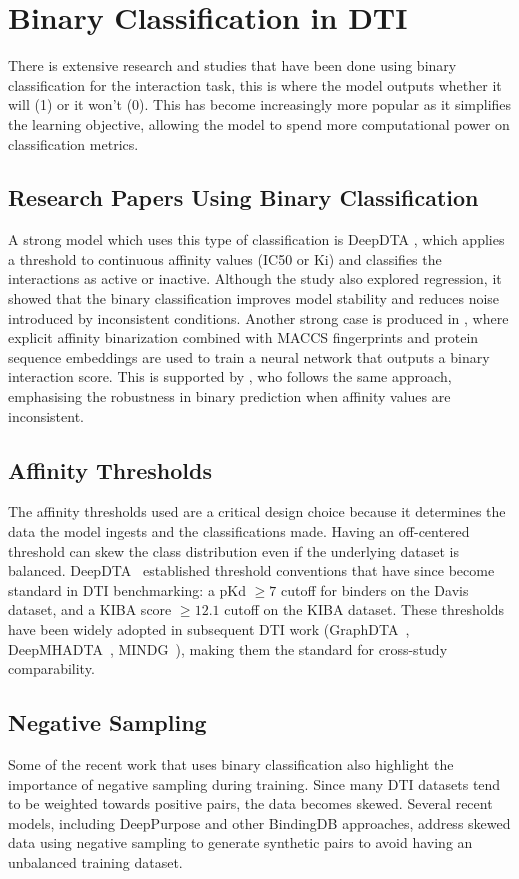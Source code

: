 \section{Binary Classification in DTI}
There is extensive research and studies that have been done using binary classification for the interaction task, this is where the model outputs whether it will (1) or it won't (0).
This has become increasingly more popular as it simplifies the learning objective, allowing the model to spend more computational power on classification metrics.

\subsection{Research Papers Using Binary Classification}
A strong model which uses this type of classification is DeepDTA \citep{Ozturk2018}, which applies a threshold to continuous affinity values (IC50 or Ki) and classifies the interactions as active or inactive.
Although the study also explored regression, it showed that the binary classification improves model stability and reduces noise introduced by inconsistent conditions.
Another strong case is produced in \citet{Talukder2025}, where explicit affinity binarization combined with MACCS fingerprints and protein sequence embeddings are used to train a neural network that outputs a binary interaction score.
This is supported by \citet{Zhan2025}, who follows the same approach, emphasising the robustness in binary prediction when affinity values are inconsistent.

\subsection{Affinity Thresholds}
The affinity thresholds used are a critical design choice because it determines the data the model ingests and the classifications made.
Having an off-centered threshold can skew the class distribution even if the underlying dataset is balanced.
DeepDTA~\citep{Ozturk2018} established threshold conventions that have since become standard in DTI benchmarking: a pKd $\geq 7$ cutoff for binders on the Davis dataset, and a KIBA score $\geq 12.1$ cutoff on the KIBA dataset.
These thresholds have been widely adopted in subsequent DTI work (GraphDTA~\citep{Nguyen2021}, DeepMHADTA~\citep{Deng2022}, MINDG~\citep{Yang2024}), making them the standard for cross-study comparability.
\subsection{Negative Sampling}
Some of the recent work that uses binary classification also highlight the importance of negative sampling during training.
Since many DTI datasets tend to be weighted towards positive pairs, the data becomes skewed.
Several recent models, including DeepPurpose \citep{DeepLearning} and other BindingDB approaches, address skewed data using negative sampling to generate synthetic pairs to avoid having an unbalanced training dataset.

